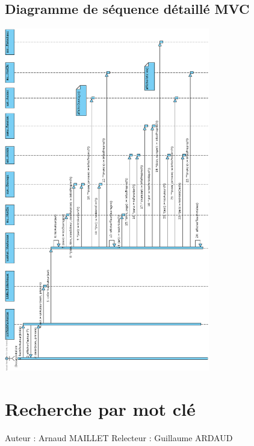 \documentclass[a4paper,10pt]{report}
\begin{document}
\section*{Diagramme de séquence détaillé MVC}
\includegraphics[height=150mm]{RechParAuteurMVC.png}

\newpage


\chapter*{Recherche par mot clé}

Auteur : Arnaud MAILLET
Relecteur : Guillaume ARDAUD

\bigskip
\end{document}
